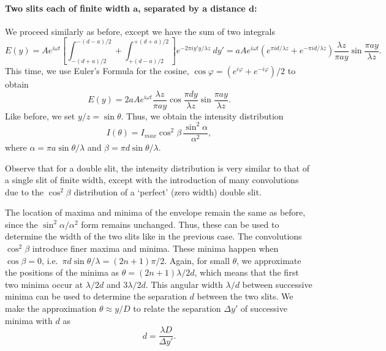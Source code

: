 \documentclass[11pt]{article}
\begin{document}
        \paragraph{Two slits each of finite width $\boldsymbol{a}$, separated by a distance $\boldsymbol{d}$:}
        We proceed similarly as before, except we have the sum of two integrals
        \[
                E(y) = Ae^{i\omega t} \left[\int_{-(d + a)/2}^{-(d - a)/2} + \int_{+(d - a)/2}^{+(d + a)/2}\right] e^{-2\pi i y' y /\lambda z}\:dy' =
                        aAe^{i\omega t}(e^{\pi i d /\lambda z} + e^{-\pi i d /\lambda z})\frac{\lambda z}{\pi a y}\sin\frac{\pi a y}{\lambda z}.
        \]
        This time, we use Euler's Formula for the cosine, $\cos\varphi = (e^{i\varphi} + e^{-i\varphi})/2$ to obtain
        \[
                E(y) =  2aAe^{i\omega t}\frac{\lambda z}{\pi a y}\cos\frac{\pi d y}{\lambda z}\sin\frac{\pi a y}{\lambda z}.
        \]
        Like before, we set $y /z = \sin\theta$. Thus, we obtain the intensity distribution
        \[
                I(\theta) = I_{max} \cos^2\beta\, \frac{\sin^2\alpha}{\alpha^2},
        \]
        where $\alpha = \pi a\sin\theta /\lambda$ and $\beta = \pi d\sin\theta /\lambda$.
        
        Observe that for a double slit, the intensity distribution is very similar to that of a single slit of finite width,
        except with the introduction of many convolutions due to the $\cos^2\beta$ distribution of a `perfect' (zero width) double slit.

        The location of maxima and minima of the envelope remain the same as before, since the $\sin^2\alpha /\alpha^2$ form remains unchanged.
        Thus, these can be used to determine the width of the two slits like in the previous case.
        The convolutions $\cos^2\beta$ introduce finer maxima and minima.
        These minima happen when $\cos\beta = 0$, i.e.\ $\pi d\sin\theta /\lambda = (2n + 1)\pi /2$. Again, for small $\theta$, we approximate the
        positions of the minima as $\theta = (2n + 1) \lambda /2d$, which means that the first two minima occur at $\lambda /2d$ and $3\lambda /2d$.
        This angular width $\lambda /d$ between successive minima can be used to determine the separation $d$ between the two slits.
        We make the approximation $\theta \approx y /D$ to relate the separation $\Delta y'$ of successive minima with $d$ as
        \[
                d = \frac{\lambda D}{\Delta y'}.
        \]

        \newpage 
\end{document}
